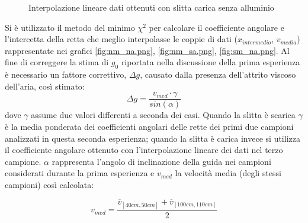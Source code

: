 \documentclass[a4paper,11pt,oneside]{article}
\begin{document}
\begin{figure}[h!]
    \centering
    \caption{Interpolazione lineare dati ottenuti con slitta carica senza alluminio}
\end{figure}

Si è utilizzato il metodo del minimo $\chi^2$ per calcolare il coefficiente angolare e l'intercetta della retta che meglio interpolasse le coppie di dati ($x_{intermedio}$, $v_{media}$) rappresentate nei grafici \ref{fig:nm_na.png}, \ref{fig:nm_sa.png}, \ref{fig:sm_na.png}. Al fine di correggere la stima di $g_0$ riportata nella discussione della prima esperienza è necessario un fattore correttivo, $\Delta g$, causato dalla presenza dell'attrito viscoso dell'aria, così stimato:
\begin{equation*}
   \Delta g=\frac{v_{med}\cdot \gamma}{sin(\alpha)}
\end{equation*}
dove $\gamma$ assume due valori differenti a seconda dei casi. Quando la slitta è scarica $\gamma$ è la media ponderata dei coefficienti angolari delle rette dei primi due campioni analizzati in questa seconda esperienza; quando la slitta è carica invece si utilizza il coefficiente angolare ottenuto con l'interpolazione lineare dei dati nel terzo campione. $\alpha$ rappresenta l'angolo di inclinazione della guida nei campioni considerati durante la prima esperienza e $v_{med}$ la velocità media (degli stessi campioni) così calcolata:

\begin{equation*}
    v_{med}=\frac{\overline{v}_{[40cm, 50cm]}+\overline{v}_{[100cm, 110cm]}}{2}
\end{equation*}
\end{document}
